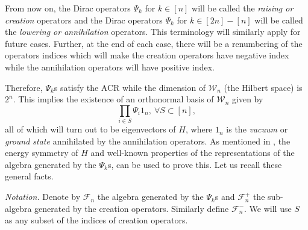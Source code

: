\documentclass[twoside,11pt,titlepage]{amsart}
\renewcommand{\=}[1]{\stackrel{#1}{=}} %
\theoremstyle{definition}
\theoremstyle{remark}
\begin{document}
From now on, the Dirac operators $\Psi_{k}$ for $k \in [n]$ will be called the \textit{raising or creation} operators and the Dirac operators $\Psi_{k}$ for $k \in [2n]-[n]$ will be called the \textit{lowering or annihilation} operators. This terminology will similarly apply for future cases. Further, at the end of each case, there will be a renumbering of the operators indices which will make the creation operators have negative index while the annihilation operators will have positive index.

Therefore, $\Psi_{k}$s satisfy the ACR while the dimension of $\mathcal{W}_n$ (the Hilbert space) is $2^n$. This implies the existence of an orthonormal basis of $\mathcal{W}_n$ given by
$$\prod\limits_{i \in S} \Psi_{i} 1_n, \ \forall S \subset [n],$$
all of which will turn out to be eigenvectors of $H$, where $1_n$ is the \textit{vacuum} or \textit{ground state} annihilated by the annihilation operators. As mentioned in \cite{fendley2014free}, the energy symmetry of $H$ and well-known properties of the representations of the algebra generated by the $\Psi_k$s, can be used to prove this. Let us recall these general facts.

\textit{Notation.} Denote by $\mathcal{F}_n$ the algebra generated by the $\Psi_k$s and $\mathcal{F}_n^+$ the sub-algebra generated by the creation operators. Similarly define $\mathcal{F}_n^-$. We will use $S$ as any subset of the indices of creation operators.
\end{document}
